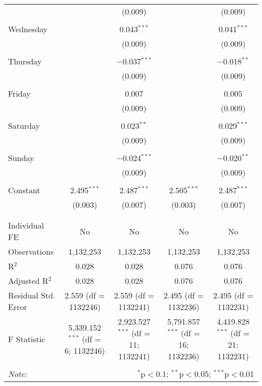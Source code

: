 \documentclass[
]{article}
\begin{document}
\begin{table}[!htbp]
{\begin{tabular}{@{\extracolsep{5pt}}lcccc}
  &  & (0.009) &  & (0.009) \\ 
  & & & & \\ 
 Wednesday &  & 0.043$^{***}$ &  & 0.041$^{***}$ \\ 
  &  & (0.009) &  & (0.009) \\ 
  & & & & \\ 
 Thursday &  & $-$0.037$^{***}$ &  & $-$0.018$^{**}$ \\ 
  &  & (0.009) &  & (0.009) \\ 
  & & & & \\ 
 Friday &  & 0.007 &  & 0.005 \\ 
  &  & (0.009) &  & (0.009) \\ 
  & & & & \\ 
 Saturday &  & 0.023$^{**}$ &  & 0.029$^{***}$ \\ 
  &  & (0.009) &  & (0.009) \\ 
  & & & & \\ 
 Sunday &  & $-$0.024$^{***}$ &  & $-$0.020$^{**}$ \\ 
  &  & (0.009) &  & (0.009) \\ 
  & & & & \\ 
 Constant & 2.495$^{***}$ & 2.487$^{***}$ & 2.505$^{***}$ & 2.487$^{***}$ \\ 
  & (0.003) & (0.007) & (0.003) & (0.007) \\ 
  & & & & \\ 
\hline \\[-1.8ex] 
Individual FE & No & No & No & No \\ 
Observations & 1,132,253 & 1,132,253 & 1,132,253 & 1,132,253 \\ 
R$^{2}$ & 0.028 & 0.028 & 0.076 & 0.076 \\ 
Adjusted R$^{2}$ & 0.028 & 0.028 & 0.076 & 0.076 \\ 
Residual Std. Error & 2.559 (df = 1132246) & 2.559 (df = 1132241) & 2.495 (df = 1132236) & 2.495 (df = 1132231) \\ 
F Statistic & 5,339.152$^{***}$ (df = 6; 1132246) & 2,923.527$^{***}$ (df = 11; 1132241) & 5,791.857$^{***}$ (df = 16; 1132236) & 4,419.828$^{***}$ (df = 21; 1132231) \\ 
\hline 
\hline \\[-1.8ex] 
\textit{Note:}  & \multicolumn{4}{r}{$^{*}$p$<$0.1; $^{**}$p$<$0.05; $^{***}$p$<$0.01} \\ 
\end{tabular}
} 
\end{table} 
\newpage
\end{document}
